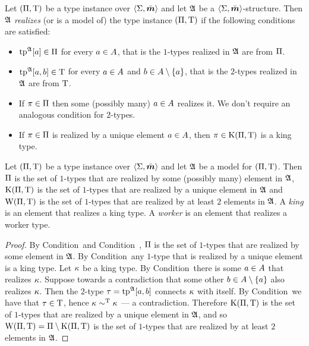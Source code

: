 \begin{definition}
Let $(\Pi,\mathrm{T})$ be a type instance over $\left\langle \mathrm{\Sigma},\bar{\bm{m}} \right\rangle$ and let
$\mathfrak{A}$ be a $\left\langle \mathrm{\Sigma},\bar{\bm{m}} \right\rangle$-structure.
Then $\mathfrak{A}$ \emph{realizes} (or is a model of) the type instance
$(\Pi,\mathrm{T})$ if the following conditions are satisfied:
\begin{itemize}
  \item[\condrealizI]\label{cond:realizI}
  $\operatorname{tp}^{\mathfrak{A}}[a] \in \Pi$ for every $a\in A$, that is the $1$-types
  realized in $\mathfrak{A}$ are from $\Pi$.
  \item[\condrealizII]\label{cond:realizII}
  $\operatorname{tp}^{\mathfrak{A}}[a,b] \in \mathrm{T}$ for every $a\in A$
  and $b \in A\setminus\left\{a\right\}$, that is the $2$-types realized in $\mathfrak{A}$
  are from $\mathrm{T}$.
  \item[\condrealizp]\label{cond:realizp}
  If $\pi \in \Pi$ then some (possibly many) $a \in A$ realizes it.
  We don't require an analogous condition for $2$-types.
  \item[\condrealizk]\label{cond:realizk}
  If $\pi \in \Pi$ is realized by a unique element $a \in A$, then
  $\pi \in \mathrm{K}(\Pi,\mathrm{T})$ is a king type.
\end{itemize}
\end{definition}
\begin{remark}\label{rem:tpi-char}
Let $(\Pi,\mathrm{T})$ be a type instance over $\left\langle \mathrm{\Sigma},\bar{\bm{m}} \right\rangle$ and let $\mathfrak{A}$
be a model for $(\Pi,\mathrm{T})$.
Then $\Pi$ is the set of $1$-types that are realized by some (possibly many)
element in $\mathfrak{A}$,
$\mathrm{K}(\Pi,\mathrm{T})$ is the set of $1$-types that are realized by a unique element
in $\mathfrak{A}$ and 
$\mathrm{W}(\Pi,\mathrm{T})$ is the set of $1$-types that are realized by at least $2$
elements in $\mathfrak{A}$.
A \emph{king} is an element that realizes a king type.
A \emph{worker} is an element that realizes a worker type.
\end{remark}
\begin{proof}
By Condition~ and Condition~, $\Pi$ is the set
of $1$-types that are realized by some element in $\mathfrak{A}$.
By Condition~ any $1$-type that is realized by a unique element
is a king type. Let $\kappa$ be a king type. By Condition~ there
is some $a \in A$ that realizes $\kappa$. Suppose towards a contradiction
that some other $b \in A \setminus \left\{a\right\}$ also realizes $\kappa$. Then the
$2$-type $\tau = \operatorname{tp}^{\mathfrak{A}}[a,b]$ connects $\kappa$ with itself.
By Condition~ we have that $\tau \in \mathrm{T}$, hence $\kappa
\sim^{\mathrm{T}} \kappa$ --- a contradiction. Therefore $\mathrm{K}(\Pi,\mathrm{T})$ is the set of
$1$-types that are realized by a unique element in $\mathfrak{A}$, and so
$\mathrm{W}(\Pi,\mathrm{T}) = \Pi \setminus \mathrm{K}(\Pi,\mathrm{T})$ is the set of $1$-types that are
realized by at least $2$ elements in $\mathfrak{A}$.
\end{proof}

